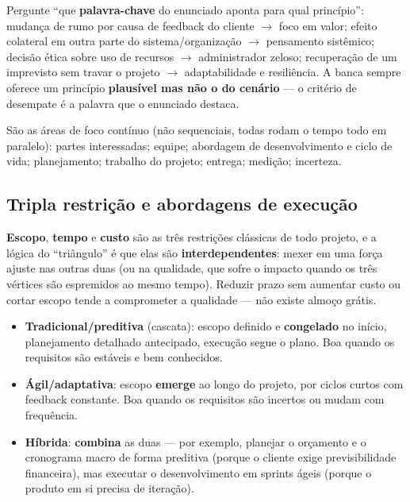 \begin{regrapratica}
Pergunte “que \textbf{palavra-chave} do enunciado aponta para qual
princípio”: mudança de rumo por causa de feedback do cliente $\to$ foco em
valor; efeito colateral em outra parte do sistema/organização $\to$
pensamento sistêmico; decisão ética sobre uso de recursos $\to$
administrador zeloso; recuperação de um imprevisto sem travar o projeto
$\to$ adaptabilidade e resiliência. A banca sempre oferece um princípio
\textbf{plausível mas não o do cenário} --- o critério de desempate é a
palavra que o enunciado destaca.
\end{regrapratica}

\begin{conceito}
São as áreas de foco contínuo (não sequenciais, todas rodam o tempo todo em
paralelo): partes interessadas; equipe; abordagem de desenvolvimento e ciclo
de vida; planejamento; trabalho do projeto; entrega; medição; incerteza.
\end{conceito}

\subsection{Tripla restrição e abordagens de execução}

\begin{conceito}
\textbf{Escopo}, \textbf{tempo} e \textbf{custo} são as três restrições
clássicas de todo projeto, e a lógica do “triângulo” é que elas são
\textbf{interdependentes}: mexer em uma força ajuste nas outras duas (ou na
qualidade, que sofre o impacto quando os três vértices são espremidos ao
mesmo tempo). Reduzir prazo sem aumentar custo ou cortar escopo tende a
comprometer a qualidade --- não existe almoço grátis.
\end{conceito}

\begin{conceito}
\begin{itemize}
\item \textbf{Tradicional/preditiva} (cascata): escopo definido e
\textbf{congelado} no início, planejamento detalhado antecipado, execução
segue o plano. Boa quando os requisitos são estáveis e bem conhecidos.
\item \textbf{Ágil/adaptativa}: escopo \textbf{emerge} ao longo do projeto,
por ciclos curtos com feedback constante. Boa quando os requisitos são
incertos ou mudam com frequência.
\item \textbf{Híbrida}: \textbf{combina} as duas --- por exemplo, planejar o
orçamento e o cronograma macro de forma preditiva (porque o cliente exige
previsibilidade financeira), mas executar o desenvolvimento em sprints
ágeis (porque o produto em si precisa de iteração).
\end{itemize}
\end{conceito}

